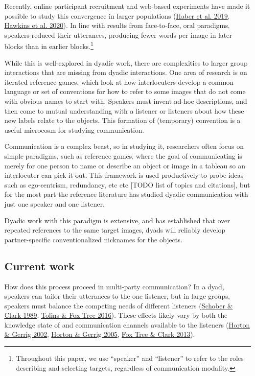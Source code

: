 \documentclass[
  english,
  a4paper,
]{article}
\begin{document}
Recently, online participant recruitment and web-based experiments have made it possible to study this convergence in larger populations (\protect\hyperlink{ref-haber2019}{Haber et al. 2019}, \protect\hyperlink{ref-hawkinsCharacterizingDynamicsLearning2020}{Hawkins et al. 2020}). In line with results from face-to-face, oral paradigms, speakers reduced their utterances, producing fewer words per image in later blocks than in earlier blocks.\footnote{Throughout this paper, we use ``speaker'' and ``listener'' to refer to the roles describing and selecting targets, regardless of communication modality.}

While this is well-explored in dyadic work, there are complexities to larger group interactions that are missing from dyadic interactions.
One area of research is on iterated reference games, which look at how interlocuters develop a common language or set of conventions for how to refer to some images that do not come with obvious names to start with. Speakers must invent ad-hoc descriptions, and then come to mutual understanding with a listener or listeners about how these new labels relate to the objects. This formation of (temporary) convention is a useful microcosm for studying communication.

Communication is a complex beast, so in studying it, researchers often focus on simple paradigms, such as reference games, where the goal of communicating is merely for one person to name or describe an object or image in a tableau so an interlocuter can pick it out. This framework is used productively to probe ideas such as ego-centrism, redundancy, etc etc {[}TODO list of topics and citations{]}, but for the most part the reference literature has studied dyadic communication with just one speaker and one listener.

Dyadic work with this paradigm is extensive, and has established that over repeated references to the same target images, dyads will reliably develop partner-specific conventionalized nicknames for the objects.

\hypertarget{current-work}{%
\subsection{Current work}\label{current-work}}

How does this process proceed in multi-party communication? In a dyad, speakers can tailor their utterances to the one listener, but in large groups, speakers must balance the competing needs of different listeners (\protect\hyperlink{ref-schober1989}{Schober \& Clark 1989}, \protect\hyperlink{ref-tolins2016}{Tolins \& Fox Tree 2016}). These effects likely vary by both the knowledge state of and communication channels available to the listeners (\protect\hyperlink{ref-horton2002}{Horton \& Gerrig 2002}, \protect\hyperlink{ref-horton2005}{Horton \& Gerrig 2005}, \protect\hyperlink{ref-fox-tree2013}{Fox Tree \& Clark 2013}).
\end{document}
